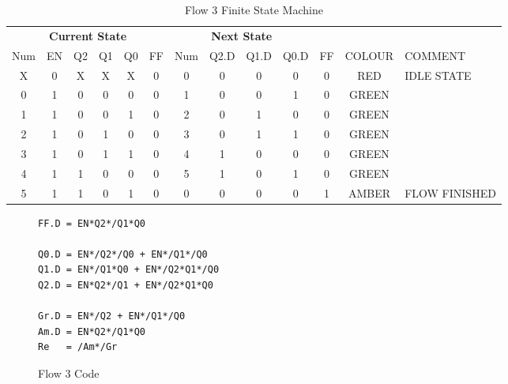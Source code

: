\begin{table*}[!Htb]
\begin{tabularx}{\linewidth}{ c c c c c c | c c c c c | c X}
  \multicolumn{6}{c|}{\textbf{Current State}} & \multicolumn{4}{c}{\textbf{Next State}} & & \\
  Num & EN & Q2 & Q1 & Q0 & FF & Num & Q2.D & Q1.D & Q0.D & FF & COLOUR & COMMENT \\
  \hline 
    X &  0 &  X &  X &  X &  0 &   0 &    0 &    0 &    0 &  0 & RED   & IDLE STATE \\
    0 &  1 &  0 &  0 &  0 &  0 &   1 &    0 &    0 &    1 &  0 & GREEN & \\
    1 &  1 &  0 &  0 &  1 &  0 &   2 &    0 &    1 &    0 &  0 & GREEN & \\
    2 &  1 &  0 &  1 &  0 &  0 &   3 &    0 &    1 &    1 &  0 & GREEN & \\
    3 &  1 &  0 &  1 &  1 &  0 &   4 &    1 &    0 &    0 &  0 & GREEN & \\
    4 &  1 &  1 &  0 &  0 &  0 &   5 &    1 &    0 &    1 &  0 & GREEN & \\
    5 &  1 &  1 &  0 &  1 &  0 &   0 &    0 &    0 &    0 &  1 & AMBER  & FLOW FINISHED\\
  \end{tabularx}
\caption{Flow 3 Finite State Machine}
\label{tab:F3sm}
\end{table*}

\begin{figure*}
\begin{lstlisting}
FF.D = EN*Q2*/Q1*Q0

Q0.D = EN*/Q2*/Q0 + EN*/Q1*/Q0
Q1.D = EN*/Q1*Q0 + EN*/Q2*Q1*/Q0
Q2.D = EN*Q2*/Q1 + EN*/Q2*Q1*Q0

Gr.D = EN*/Q2 + EN*/Q1*/Q0
Am.D = EN*Q2*/Q1*Q0
Re   = /Am*/Gr
\end{lstlisting}
\caption{Flow 3 Code}
\label{lst:F3}
\end{figure*}